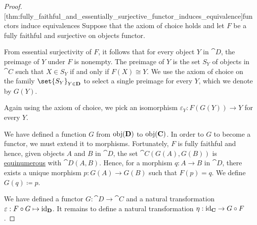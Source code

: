 \begin{proof}
  [thm:fully_faithful_and_essentially_surjective_functor_induces_equivalence]{functors induce equivalences} Suppose that the axiom of choice holds and let \( F \) be a fully faithful and surjective on objects functor.

  From essential surjectivity of \( F \), it follows that for every object \( Y \) in \( \cat{D} \), the preimage of \( Y \) under \( F \) is nonempty. The preimage of \( Y \) is the set \( S_Y \) of objects in \( \cat{C} \) such that \( X \in S_Y \) if and only if \( F(X) \cong Y \). We use the axiom of choice on the family \( \set{ S_Y }_{Y \in \cat{D}} \) to select a single preimage for every \( Y \), which we denote by \( G(Y) \).

  Again using the axiom of choice, we pick an isomorphism \( \varepsilon_Y: F(G(Y)) \to Y \) for every \( Y \).

  We have defined a function \( G \) from \( \operatorname{obj}(\operatorname{\mathbf{D}}) \) to \( \operatorname{obj}(\operatorname{\mathbf{C}}) \). In order to \( G \) to become a functor, we must extend it to morphisms. Fortunately, \( F \) is fully faithful and hence, given objects \( A \) and \( B \) in \( \cat{D} \), the set \( \cat{C}(G(A), G(B)) \) is \hyperref[def:equinumerosity]{equinumerous} with \( \cat{D}(A, B) \). Hence, for a morphism \( q: A \to B \) in \( \cat{D} \), there exists a unique morphism \( p: G(A) \to G(B) \) such that \( F(p) = q \). We define \( G(q) \coloneqq p \).

  We have defined a functor \( G: \cat{D} \to \cat{C} \) and a natural transformation \( \varepsilon: F \bincirc G \mapsto \id_{\cat{D}} \). It remains to define a natural transformation \( \eta: \id_{\cat{C}} \to G \bincirc F \).



\end{proof}

